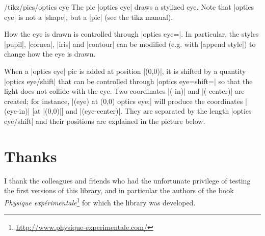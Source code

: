\documentclass[a4paper]{ltxdoc}
\begin{document}
\begin{stylekey}{/tikz/pics/optics eye}
The pic |optics eye| draws a stylized eye.
Note that |optics eye| is not a |shape|, but a |pic| (see the tikz manual).

\begin{codeexample}[]
\end{codeexample}


How the eye is drawn is controlled through |optics eye={}|.
In particular, the styles |pupil|, |cornea|, |iris| and |contour| can be modified (e.g. with |append style|) to change how the eye is drawn.

\begin{codeexample}[]
\end{codeexample}

When a |optics eye| pic is added at position |(0,0)|, it is shifted by a quantity |optics eye/shift| that can be controlled through |optics eye={shift=}| so that the light does not collide with the eye.
Two coordinates |(-in)| and |(-center)| are created; for instance, |\pic (eye) at (0,0) {optics eye};| will produce the coordinates |(eye-in)| [at |(0,0)|] and |(eye-center)|. They are separated by the length |optics eye/shift| and their positions are explained in the picture below.


\end{stylekey}


\section{Thanks}

I thank the colleagues and friends who had the unfortunate privilege of testing the first versions of this library, and in particular the authors of the book \emph{Physique expérimentale}\footnote{\url{http://www.physique-experimentale.com/}} for which the library was developed.
\end{document}
